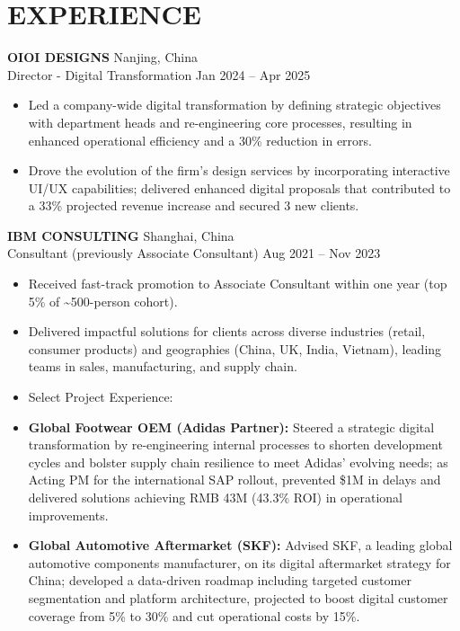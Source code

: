 \documentclass[9pt, letterpaper]{article}
\newenvironment{highlights}{
    \begin{itemize}[
        topsep=0.02cm,
        parsep=0.02cm,
        partopsep=0pt,
        itemsep=0pt,
        leftmargin=10pt
    ]
}{
    \end{itemize}
}
\begin{document}
    \section{EXPERIENCE}
    \noindent\textbf{OIOI DESIGNS} \hfill Nanjing, China \\
    Director - Digital Transformation \hfill Jan 2024 – Apr 2025
    \begin{highlights}
        \item Led a company-wide digital transformation by defining strategic objectives with department heads and re-engineering core processes, resulting in enhanced operational efficiency and a 30\% reduction in errors.
        \item Drove the evolution of the firm's design services by incorporating interactive UI/UX capabilities; delivered enhanced digital proposals that contributed to a 33\% projected revenue increase and secured 3 new clients.
    \end{highlights}

    \vspace{0.1cm}

    \noindent\textbf{IBM CONSULTING} \hfill Shanghai, China \\
    Consultant (previously Associate Consultant) \hfill Aug 2021 – Nov 2023
    \begin{highlights}
        \item Received fast-track promotion to Associate Consultant within one year (top 5\% of \textasciitilde500-person cohort).
        \item Delivered impactful solutions for clients across diverse industries (retail, consumer products) and geographies (China, UK, India, Vietnam), leading teams in sales, manufacturing, and supply chain.
        \item Select Project Experience:
        \item \hspace{5pt} \textbf{Global Footwear OEM (Adidas Partner):} Steered a strategic digital transformation by re-engineering internal processes to shorten development cycles and bolster supply chain resilience to meet Adidas' evolving needs; as Acting PM for the international SAP rollout, prevented \$1M in delays and delivered solutions achieving RMB 43M (43.3\% ROI) in operational improvements.
        \item \hspace{5pt} \textbf{Global Automotive Aftermarket (SKF):} Advised SKF, a leading global automotive components manufacturer, on its digital aftermarket strategy for China; developed a data-driven roadmap including targeted customer segmentation and platform architecture, projected to boost digital customer coverage from 5\% to 30\% and cut operational costs by 15\%.
    \end{highlights}
\end{document}
